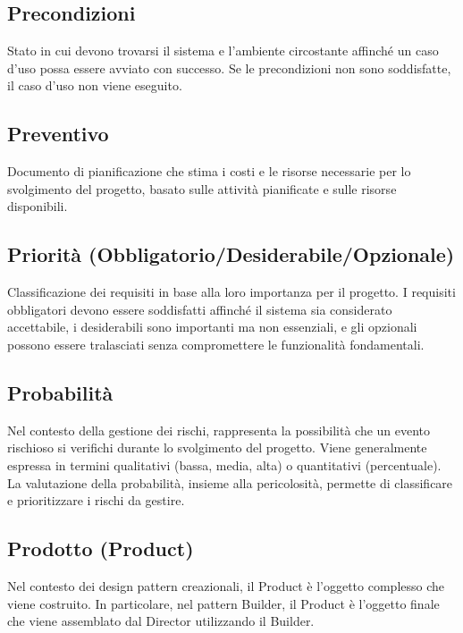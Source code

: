\documentclass[a4paper,11pt]{article}
\begin{document}
\subsection{Precondizioni}
Stato in cui devono trovarsi il sistema e l'ambiente circostante affinché un caso d'uso possa essere avviato con successo. Se le precondizioni non sono soddisfatte, il caso d'uso non viene eseguito.








\subsection{Preventivo}
Documento di pianificazione che stima i costi e le risorse necessarie per lo svolgimento del progetto, basato sulle attività pianificate e sulle risorse disponibili.









\subsection{Priorità (Obbligatorio/Desiderabile/Opzionale)}
Classificazione dei requisiti in base alla loro importanza per il progetto. I requisiti obbligatori devono essere soddisfatti affinché il sistema sia considerato accettabile, i desiderabili sono importanti ma non essenziali, e gli opzionali possono essere tralasciati senza compromettere le funzionalità fondamentali.








\subsection{Probabilità}
Nel contesto della gestione dei rischi, rappresenta la possibilità che un evento rischioso si verifichi durante lo svolgimento del progetto. Viene generalmente espressa in termini qualitativi (bassa, media, alta) o quantitativi (percentuale). La valutazione della probabilità, insieme alla pericolosità, permette di classificare e prioritizzare i rischi da gestire.









\subsection{Prodotto (Product)}
Nel contesto dei design pattern creazionali, il Product è l'oggetto complesso che viene costruito. In particolare, nel pattern Builder, il Product è l'oggetto finale che viene assemblato dal Director utilizzando il Builder.
\end{document}
